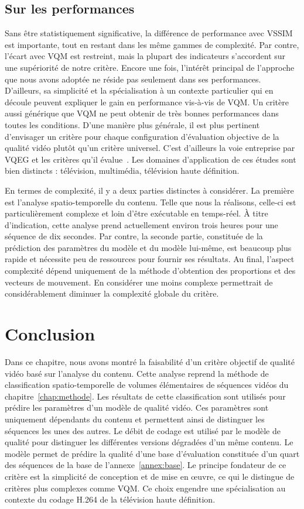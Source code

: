 \subsection{Sur les performances}
Sans être statistiquement significative, la différence de performance avec VSSIM est importante, tout en restant dans les même gammes de complexité. Par contre, l'écart avec VQM est restreint, mais la plupart des indicateurs s'accordent sur une supériorité de notre critère. Encore une fois, l'intérêt principal de l'approche que nous avons adoptée ne réside pas seulement dans ses performances. D'ailleurs, sa simplicité et la spécialisation à un contexte particulier qui en découle peuvent expliquer le gain en performance vis-à-vis de VQM. Un critère aussi générique que VQM ne peut obtenir de très bonnes performances dans toutes les conditions. D'une manière plus générale, il est plus pertinent d'envisager un critère pour chaque configuration d'évaluation objective de la qualité vidéo plutôt qu'un critère universel. C'est d'ailleurs la voie entreprise par VQEG et les critères qu'il évalue~\cite{vqeg-frtv2,vqeg-MMtestplan,vqeg-hdtvtestplan}. Les domaines d'application de ces études sont bien distincts : télévision, multimédia, télévision haute définition.

En termes de complexité, il y a deux parties distinctes à considérer. La première est l'analyse spatio-temporelle du contenu. Telle que nous la réalisons, celle-ci est particulièrement complexe et loin d'être exécutable en temps-réel. À titre d'indication, cette analyse prend actuellement environ trois heures pour une séquence de dix secondes. Par contre, la seconde partie, constituée de la prédiction des paramètres du modèle et du modèle lui-même, est beaucoup plus rapide et nécessite peu de ressources pour fournir ses résultats. Au final, l'aspect complexité dépend uniquement de la méthode d'obtention des proportions et des vecteurs de mouvement. En considérer une moins complexe permettrait de considérablement diminuer la complexité globale du critère.


\section{Conclusion}
Dans ce chapitre, nous avons montré la faisabilité d'un critère objectif de qualité vidéo basé sur l'analyse du contenu. Cette analyse reprend la méthode de classification spatio-temporelle de volumes élémentaires de séquences vidéos du chapitre~\ref{chap:methode}. Les résultats de cette classification sont utilisés pour prédire les paramètres d'un modèle de qualité vidéo. Ces paramètres sont uniquement dépendants du contenu et permettent ainsi de distinguer les séquences les unes des autres. Le débit de codage est utilisé par le modèle de qualité pour distinguer les différentes versions dégradées d'un même contenu. Le modèle permet de prédire la qualité d'une base d'évaluation constituée d'un quart des séquences de la base de l'annexe~\ref{annex:base}. Le principe fondateur de ce critère est la simplicité de conception et de mise en \oe uvre, ce qui le distingue de critères plus complexes comme VQM. Ce choix engendre une spécialisation au contexte du codage H.264 de la télévision haute définition.

